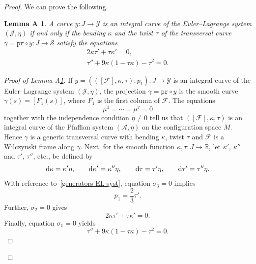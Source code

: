 \documentclass[10pt,a4paper]{amsart}
\numberwithin{equation}{section}
\newtheorem{lemmaA}{Lemma A\ignorespaces}
\def\S{\mathcal{S}}
\def\S{\mathcal{S}}
\begin{document}
\begin{proof}
We can prove the following.

\begin{lemmaA}\label{l:eqns-motion}
A curve $y\colon J \to \mathcal{Y}$ is an integral curve of the Euler--Lagrange system $(\mathcal{J}, \eta)$ if and only if
the bending $\kappa$ and the twist $\tau$ of the transversal curve $\gamma = \mathtt{pr}\circ y\colon J \to \S$
satisfy the equations
\begin{gather}
 2\kappa \tau' + \tau \kappa' = 0 ,\label{eqns-motion1} \\
 \tau'' + 9 \kappa(1 -\tau\kappa) - \tau^2 = 0\label{eqns-motion2} .
\end{gather}
\end{lemmaA}

\begin{proof}[Proof of Lemma A\ref{l:eqns-motion}]

If $y= (([\mathcal{F}], \kappa, \tau); p_1) \colon J \to \mathcal{Y}$ is an integral curve of the Euler--Lagrange system
$(\mathcal{J}, \eta)$,
the projection $\gamma = \mathtt{pr}\circ y$ is the smooth curve $\gamma(s) = [{F}_1(s)]$,
where ${F}_1$ is the first column of $\mathcal{F}$.
%
The equations
\[
\mu^1= \cdots= \mu^7 =0
\]
 together with the
independence condition $\eta\neq 0$ tell us that $([\mathcal{F}], \kappa, \tau)$
is an integral curve of the Pfaffian system $(\mathcal{A}, \eta)$ on the configuration space $M$.
Hence $\gamma$ is a generic transversal curve with bending $\kappa$, twist $\tau$ and $\mathcal{F}$
is a Wilczynski frame along $\gamma$.
%
%
Next, for the smooth function $\kappa, \tau\colon J \to \mathbb{R}$, let $\kappa'$, $\kappa''$ and $\tau'$, $\tau''$, etc.,
be defined by
\[
 {\rm d}\kappa = \kappa' \eta,\qquad {\rm d}\kappa' = \kappa''\eta, \qquad {\rm d}\tau = \tau' \eta, \qquad {\rm d}\tau' = \tau''\eta .
 \]
With reference to~\eqref{generators-EL-syst}, equation $\sigma_3 = 0$ implies
\[
 p_1 = \frac23 \tau' .
 \]
Further, $\sigma_2=0$ gives
\[
 2\kappa \tau' + \tau \kappa' = 0 .
 \]
%
Finally, equation $\sigma_1 =0$ yields
\[
 \tau'' + 9 \kappa(1 -\tau\kappa) - \tau^2 = 0 .
 \]
%
%


\end{proof}
\end{proof}
\end{document}
